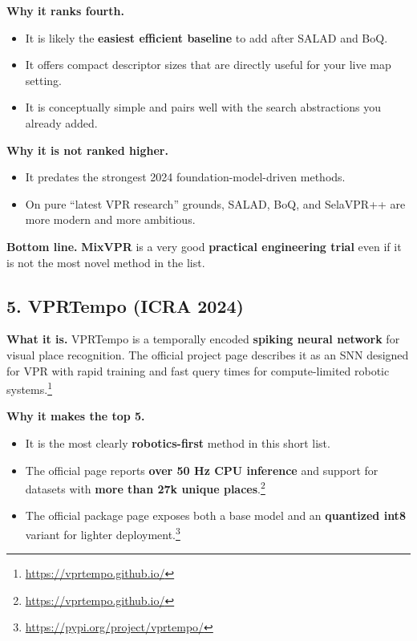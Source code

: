 \documentclass[11pt]{article}
\begin{document}
\textbf{Why it ranks fourth.}
\begin{itemize}[leftmargin=*]
  \item It is likely the \textbf{easiest efficient baseline} to add after SALAD and BoQ.
  \item It offers compact descriptor sizes that are directly useful for your live map setting.
  \item It is conceptually simple and pairs well with the search abstractions you already added.
\end{itemize}

\textbf{Why it is not ranked higher.}
\begin{itemize}[leftmargin=*]
  \item It predates the strongest 2024 foundation-model-driven methods.
  \item On pure ``latest VPR research'' grounds, SALAD, BoQ, and SelaVPR++ are more modern and more ambitious.
\end{itemize}

\textbf{Bottom line.} \textbf{MixVPR} is a very good \textbf{practical engineering trial} even if it is not the most novel method in the list.

\subsection*{5. VPRTempo (ICRA 2024)}
\textbf{What it is.} VPRTempo is a temporally encoded \textbf{spiking neural network} for visual place recognition. The official project page describes it as an SNN designed for VPR with rapid training and fast query times for compute-limited robotic systems.\footnote{\url{https://vprtempo.github.io/}}

\textbf{Why it makes the top 5.}
\begin{itemize}[leftmargin=*]
  \item It is the most clearly \textbf{robotics-first} method in this short list.
  \item The official page reports \textbf{over 50 Hz CPU inference} and support for datasets with \textbf{more than 27k unique places}.\footnote{\url{https://vprtempo.github.io/}}
  \item The official package page exposes both a base model and an \textbf{quantized int8} variant for lighter deployment.\footnote{\url{https://pypi.org/project/vprtempo/}}
\end{itemize}
\end{document}
